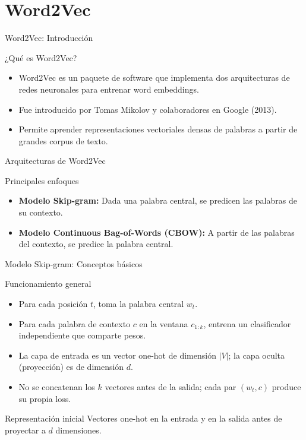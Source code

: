 \documentclass[handout]{beamer}
\begin{document}
\section{Word2Vec}

\begin{frame}{Word2Vec: Introducción}
  \begin{block}{¿Qué es Word2Vec?}
    \begin{itemize}
      \item Word2Vec es un paquete de software que implementa dos arquitecturas de redes neuronales para entrenar word embeddings.
      \item Fue introducido por Tomas Mikolov y colaboradores en Google (2013).
      \item Permite aprender representaciones vectoriales densas de palabras a partir de grandes corpus de texto.
    \end{itemize}
  \end{block}
\end{frame}

\begin{frame}{Arquitecturas de Word2Vec}
  \begin{block}{Principales enfoques}
    \begin{itemize}
      \item \textbf{Modelo Skip-gram:} Dada una palabra central, se predicen las palabras de su contexto.
      \item \textbf{Modelo Continuous Bag-of-Words (CBOW):} A partir de las palabras del contexto, se predice la palabra central.
    \end{itemize}
  \end{block}
\end{frame}


\begin{frame}{Modelo Skip-gram: Conceptos básicos}
  \begin{block}{Funcionamiento general}
    \begin{itemize}
      \item Para cada posición $t$, toma la palabra central $w_t$.
      \item Para cada palabra de contexto $c$ en la ventana $c_{1:k}$, entrena un clasificador independiente que comparte pesos.
      \item La capa de entrada es un vector one-hot de dimensión $|V|$; la capa oculta (proyección) es de dimensión $d$.
      \item No se concatenan los $k$ vectores antes de la salida; cada par $(w_t,c)$ produce su propia loss.
    \end{itemize}
  \end{block}
  \begin{alertblock}{Representación inicial}
    Vectores one-hot en la entrada y en la salida antes de proyectar a $d$ dimensiones.
  \end{alertblock}
\end{frame}
\end{document}
